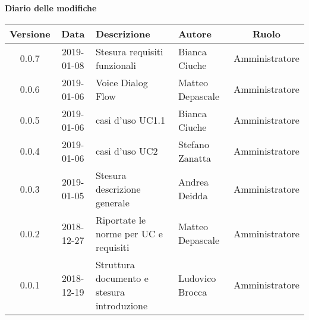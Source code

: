 	\begin{center}
		\textbf{Diario delle modifiche}
	\end{center}
	\begin{center}
		\begin{tabularx}{\textwidth}{|c|c|X|X|c|}
			\hline
			\textbf{Versione} & \textbf{Data} & \textbf{Descrizione} & \textbf{Autore} & \textbf{Ruolo} \\
			\hline
			0.0.7 & 2019-01-08 &Stesura requisiti funzionali& Bianca Ciuche& Amministratore\\
			\hline
			0.0.6 & 2019-01-06 & Voice Dialog Flow & Matteo Depascale & Amministratore\\
			\hline
			0.0.5 & 2019-01-06 & casi d'uso UC1.1& Bianca Ciuche & Amministratore\\
			\hline
			0.0.4 & 2019-01-06 & casi d'uso UC2& Stefano Zanatta & Amministratore\\
			\hline
			0.0.3 & 2019-01-05 & Stesura descrizione generale& Andrea Deidda & Amministratore\\
			\hline
			0.0.2 & 2018-12-27 & Riportate le norme per UC e requisiti& Matteo Depascale & Amministratore\\
			\hline
			0.0.1 & 2018-12-19 & Struttura documento e stesura introduzione& Ludovico Brocca & Amministratore\\
			\hline
		\end{tabularx}
	\end{center}
\newpage